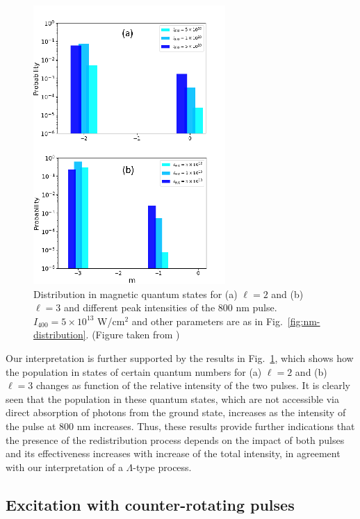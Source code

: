 \begin{figure}[!ht]
\centering
\includegraphics[width=0.5\columnwidth]{figs/Rydberg/Gebre-bicircular-Fig5.png}
\caption{\label{fig:nm-fixedl-distribution}
{
Distribution in magnetic quantum states for (a) $\ell = 2$ and (b) $\ell = 3 $ and different peak intensities of the 800 nm pulse. $I_{400} = 5\times 10^{13}$ W/cm$^2$ and other parameters are as in Fig.~\ref{fig:nm-distribution}. (Figure taken from \cite{venzke2020_ryd})}
}
\end{figure}

Our interpretation is further supported by the results in Fig.~\ref{fig:nm-fixedl-distribution}, which shows how the population in states of certain quantum numbers for (a) $\ell = 2$ and (b) $\ell = 3$ changes as function of the relative intensity of the two pulses. It is clearly seen that the population in these quantum states, which are not accessible via direct absorption of photons from the ground state, increases as the intensity of the pulse at 800 nm increases. Thus, these results provide further indications that the presence of the redistribution process depends on the impact of both pulses and its effectiveness increases with increase of the total intensity, in agreement with our interpretation of a $\Lambda$-type process.

\subsection{Excitation with counter-rotating pulses}

